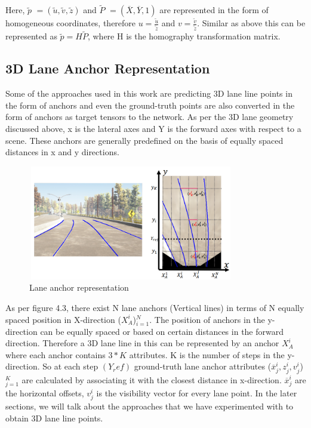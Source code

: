     Here, \textbf{$\widetilde{p}$} $= (\widetilde{u}, \widetilde{v}, \widetilde{z})$ and  \textbf{$\widetilde{P}$} $= (\overline{X},\overline{Y},1 )$ are represented in the form of homogeneous coordinates, therefore $u = \frac{\widetilde{u}} {\widetilde{z}} $ and $v = \frac{\widetilde{v}} {\widetilde{z}} $. Similar as above this can be represented as \textbf{$\widetilde{p} = H\widetilde{P}$}, where H is the homography transformation matrix. 
    
     \subsection{3D Lane Anchor Representation}
    Some of the approaches used in this work are predicting 3D lane line points in the form of anchors and even the ground-truth points are also converted in the form of anchors as target tensors to the network.  As per the 3D lane geometry discussed above, x is the lateral axes and Y is the forward axes with respect to a scene. These anchors are generally predefined on the basis of equally spaced distances in x and y directions. 
    
     \begin{figure}[h]
    \centering
    \includegraphics[width=9cm, height=5cm]{images/anchor_3Dlane.png}
    \caption{Lane anchor representation \cite{guo2020gen}}
    \end{figure}
    
    As per figure 4.3, there exist N lane anchors (Vertical lines) in terms of N equally spaced position in X-direction ($X^{i}_{A}$)$^{N}_{i=1}$. The position of anchors in the y-direction can be equally spaced or based on certain distances in the forward direction. Therefore a 3D lane line in this can be represented by an anchor $X^{i}_{A}$ where each anchor contains $3*K$ attributes. K is the number of steps in the y-direction. So at each step $(Y_ref)$ ground-truth lane anchor attributes ($\overline{x}^{i}_{j},z^{i}_{j},v^{i}_{j}$)$^{K}_{j=1}$ are calculated by associating it with the closest distance in x-direction. $\overline{x}^{i}_{j}$ are the horizontal offsets, $v^{i}_{j}$ is the visibility vector for every lane point.  In the later sections, we will talk about the approaches that we have experimented with to obtain 3D lane line points. 
        
